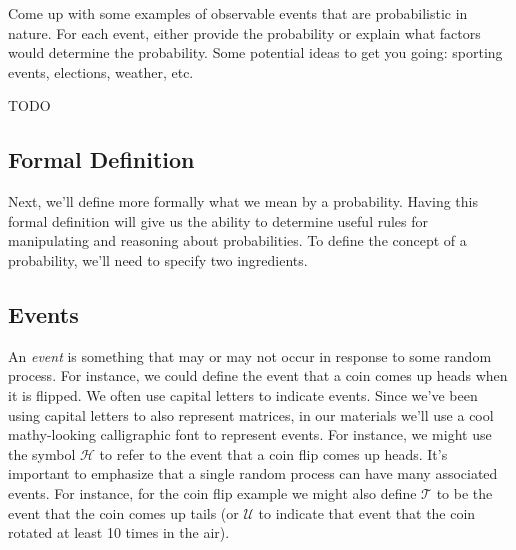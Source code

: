 \documentclass[assignment01_Solutions]{subfiles}
\begin{document}
\vspace{1em}
\begin{exercise}[(10 minutes)]
Come up with some examples of observable events that are probabilistic in nature.  For each event, either provide the probability or explain what factors would determine the probability.  Some potential ideas to get you going: sporting events, elections, weather, etc.

\begin{boxedsolution}
TODO
\end{boxedsolution}

\end{exercise}

\subsection{Formal Definition}

Next, we'll define more formally what we mean by a probability.  Having this formal definition will give us the ability to determine useful rules for manipulating and reasoning about probabilities.  To define the concept of a probability, we'll need to specify two ingredients.
\subsection{Events}

An \emph{event} is something that may or may not occur in response to some random process.  For instance, we could define the event that a coin comes up heads when it is flipped.  We often use capital letters to indicate events.  Since we've been using capital letters to also represent matrices, in our materials we'll use a cool mathy-looking calligraphic font to represent events.  For instance, we might use the symbol $\mathcal{H}$ to refer to the event that a coin flip comes up heads. It's important to emphasize that a single random process can have many associated events.   For instance, for the coin flip example we might also define $\mathcal{T}$ to be the event that the coin comes up tails (or $\mathcal{U}$ to indicate that event that the coin rotated at least 10 times in the air).
\end{document}
